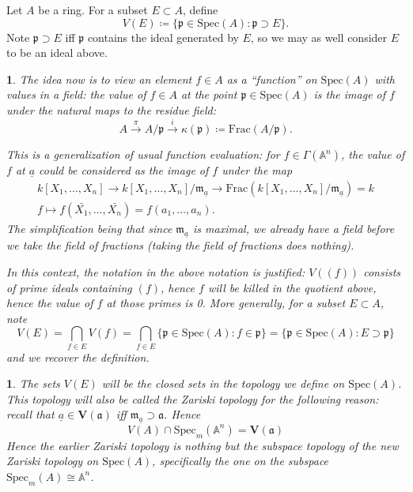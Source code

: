 \documentclass[12pt]{article}
\newtheorem{para}[theorem]{}
\begin{document}
\begin{definition}
	Let $A$ be a ring. For a subset $E\subset A$, define 
	\begin{equation*}
		V(E) \coloneqq \{\mathfrak{p}\in\text{Spec}(A) : \mathfrak{p}\supset E \}.
	\end{equation*}
	Note $\mathfrak{p}\supset E$ iff $\mathfrak{p}$ contains the ideal generated by $E$, so we may as well consider $E$ to be an ideal above.
\end{definition}

\begin{para}
The idea now is to view an element $f\in A$ as a ``function'' on $\text{Spec}(A)$ with values in a field: the value of $f\in A$ at the point $\mathfrak{p}\in\text{Spec}(A)$ is the image of $f$ under the natural maps to the residue field: 
\begin{equation*}
	A \overset{\pi}{\longrightarrow} A/\mathfrak{p} \overset{i}{\longrightarrow} \kappa(\mathfrak{p})\coloneqq \text{Frac}(A/\mathfrak{p}).
\end{equation*}

This is a generalization of usual function evaluation: for $f\in\Gamma(\mathbb{A}^n)$, the value of $f$ at $\underline{a}$ could be considered as the image of $f$ under the map 
\begin{gather*}
	k[X_1,\dots,X_n] \to k[X_1,\dots,X_n]/\mathfrak{m}_{\underline{a}} \to \text{Frac}(k[X_1,\dots,X_n]/\mathfrak{m}_{\underline{a}}) = k \\
	f \mapsto f(\bar{X_1},\dots,\bar{X_n}) = f(a_1,\dots,a_n).
\end{gather*}
The simplification being that since $\mathfrak{m}_{\underline{a}}$ is maximal, we already have a field before we take the field of fractions (taking the field of fractions does nothing).

In this context, the notation in the above notation is justified: $V((f))$ consists of prime ideals containing $(f)$, hence $f$ will be killed in the quotient above, hence the value of $f$ at those primes is 0. More generally, for a subset $E\subset A$, note 
\begin{equation*}
	V(E) = \bigcap_{f\in E}V(f) = \bigcap_{f\in E} \{\mathfrak{p}\in\text{Spec}(A) : f\in\mathfrak{p}\} = \{\mathfrak{p}\in\text{Spec}(A): E\supset\mathfrak{p}\}
\end{equation*}
and we recover the definition. 
\end{para}

\begin{para}
The sets $V(E)$ will be the closed sets in the topology we define on $\text{Spec}(A)$. This topology will also be called the Zariski topology for the following reason: recall that $\underline{a}\in\mathbf{V}(\mathfrak{a})$ iff $\mathfrak{m}_{\underline{a}}\supset\mathfrak{a}$. Hence 
\begin{equation*}
	V(A)\cap\text{Spec}_m(\mathbb{A}^n) = \mathbf{V}(\mathfrak{a})
\end{equation*}
Hence the earlier Zariski topology is nothing but the subspace topology of the new Zariski topology on $\text{Spec}(A)$, specifically the one on the subspace $\text{Spec}_m(A)\cong\mathbb{A}^n$.
\end{para}
\end{document}
